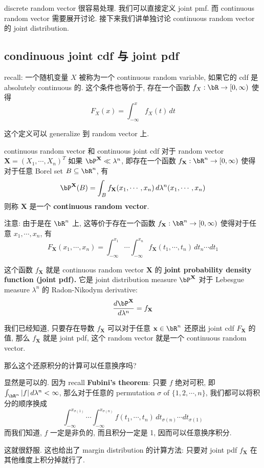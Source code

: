 discrete random vector 很容易处理. 我们可以直接定义 joint pmf.
而 continuous random vector 需要展开讨论. 接下来我们讲单独讨论
continuous random vector 的 joint distribution.

\subsection{condinuous joint cdf 与 joint pdf}
recall:
 一个随机变量 \(X\) 被称为一个 continuous random variable, 如果它的
cdf 是 absolutely continuous 的. 这个条件也等价于, 存在一个函数 \(f_X: \bR \to [0,\infty)\) 
使得 \[
F_X(x) = \int_{-\infty}^x f_X(t) \, dt
\]

这个定义可以 generalize 到 random vector 上.
\begin{definition}{continuous random vector 和 continuous joint cdf}
    对于 random vector  \(\mathbf{X} = (X_1,\cdots, X_n)^T\) 
    如果 \(\bP^{\mathbf{X}} \ll \lambda^n\),
    即存在一个函数 \(f_{\mathbf{X}}: \bR^n \to [0,\infty)\) 使得对于任意 Borel set \(B \subseteq \bR^n\), 有
\[\bP^{\mathbf{X}}(B) = \int_B f_{\mathbf{X}}(x_1, \cdots, x_n) \, d\lambda^n(x_1, \cdots, x_n)\]
    则称 \(\mathbf{X}\) 是一个 \textbf{continuous random vector}.

    注意: 由于是在 \(\bR^n\) 上, 这等价于存在一个函数 \(f_{\mathbf{X}}: \bR^n \to [0,\infty)\) 使得对于任意 \(x_1, \cdots, x_n\), 有
     \[F_{\mathbf{X}}(x_1, \cdots, x_n) = \int_{-\infty}^{x_1} \cdots \int_{-\infty}^{x_n} f_{\mathbf{X}}(t_1, \cdots, t_n) \, dt_n \cdots dt_1\]
\end{definition}
\begin{remark}
    这个函数 \(f_{\mathbf{X}}\) 
    就是 continuous random vector \(\mathbf{X}\) 
    的 \textbf{joint probability density function (joint pdf).}
    它是 joint distribution measure \(\bP^{\mathbf{X}}\) 
    对于 Lebesgue measure \(\lambda^n\) 的 Radon-Nikodym derivative: \[\frac{d\bP^{\mathbf{X}}}{d\lambda^n} = f_{\mathbf{X}}\]
\end{remark}
\begin{remark}
    我们已经知道, 只要存在导数 \(f_{\mathbf{X}}\) 可以对于任意 \(\mathbf{x}\in \bR^n\) 
    还原出 joint cdf \(F_{\mathbf{X}}\) 的值, 那么 \(f_{\mathbf{X}}\) 就是 joint pdf, 
    这个 random vector 就是一个 continuous random vector.

    那么这个还原积分的计算可以任意换序吗? 

    显然是可以的. 因为 recall \textbf{Fubini's theorem}: 只要 \(f\) 绝对可积, 即 
    \(\int_{\bR^n} |f| \, d\lambda^n < \infty\), 
    那么对于任意的 permutation \(\sigma\) of \(\{1,2,\cdots,n\}\), 我们都可以将积分的顺序换成
     \[\int_{-\infty}^{x_{\sigma(1)}} \cdots \int_{-\infty}^{x_{\sigma(n)}} 
     f(t_1, \cdots, t_n) \, dt_{\sigma(n)} \cdots dt_{\sigma(1)}\]
    而我们知道, \(f\) 一定是非负的, 而且积分一定是 1, 因而可以任意换序积分. 
    
    这就很舒服. 这也给出了 margin distribution 的计算方法: 
    只要对 joint pdf \(f_{\mathbf{X}}\) 在其他维度上积分掉就行了.
\end{remark}
